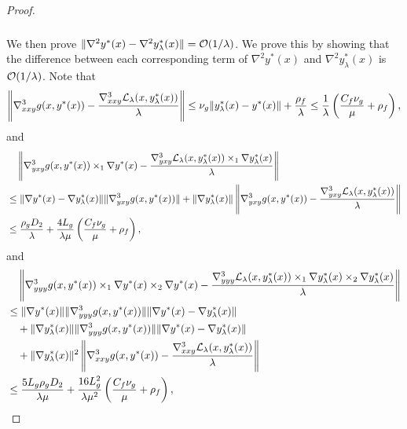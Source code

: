 \begin{proof}
{\begin{align}
\begin{split}
    \end{split}
    \end{align}}
{We then prove $\Vert \nabla^2 y^*(x) - \nabla^2 y_{\lambda}^*(x) \Vert = {\mathcal{O}}(1/\lambda)$. We prove this by showing that the difference between each corresponding term of $\nabla^2 y^*(x)$ and $\nabla^2 y_{\lambda}^*(x)$ is ${\mathcal{O}}(1/\lambda)$.}
Note that 
\begin{align*}
    \left \Vert  \nabla_{xxy}^3  g(x,y^*(x)) - \frac{\nabla_{xxy}^3 {\mathcal{L}}_{\lambda} (x,y_{\lambda}^*(x))  }{\lambda}   \right \Vert \le \nu_g \Vert y_{\lambda}^*(x) - y^*(x) \Vert + \frac{\rho_f}{\lambda} \le \frac{1}{\lambda} \left(\frac{C_f \nu_g}{\mu} +\rho_f \right),
\end{align*}
and
\begin{align*}
    &\quad \left \Vert 
    \nabla_{yxy}^3 g(x,y^*(x)) \times_1 \nabla y^*(x)  - \frac{\nabla_{yxy}^3 {\mathcal{L}}_{\lambda} (x,y_{\lambda}^*(x)) \times_1 \nabla y_{\lambda}^*(x) }{\lambda}
    \right \Vert \\
    &\le \Vert \nabla y^*(x) - \nabla y_{\lambda}^*(x) \Vert \Vert \nabla_{yxy}^3 g(x,y^*(x)) \Vert + \Vert \nabla y_{\lambda}^*(x) \Vert \left\Vert \nabla_{yxy}^3 g(x,y^*(x)) - \frac{\nabla_{yxy}^3 {\mathcal{L}}_{\lambda}(x, y_{\lambda}^*(x))}{\lambda} \right \Vert \\
    &\le \frac{\rho_g D_2}{\lambda} + \frac{4L_g}{\lambda \mu} \left( \frac{C_f \nu_g}{\mu} + \rho_f \right),
\end{align*}
and
{ 
\begin{align*}
    &\quad  \left \Vert
   \nabla_{yyy}^3 g(x,y^*(x)) \times_1  \nabla y^*(x)  \times_2 \nabla y^*(x)  - \frac{\nabla_{yyy}^3 {\mathcal{L}}_{\lambda} (x,y_{\lambda}^*(x)) \times_1 \nabla y_{\lambda}^*(x) \times_2  \nabla y_{\lambda}^*(x)} { \lambda}
    \right \Vert \\
    &\le \Vert \nabla y^*(x) \Vert \Vert \nabla_{yyy}^3 g(x,y^*(x))\Vert \Vert \nabla y^*(x) - \nabla y_{\lambda}^*(x) \Vert  \\
    &\quad + \Vert \nabla y_{\lambda}^*(x) \Vert \Vert \nabla_{yyy}^3 g(x,y^*(x))\Vert \Vert \nabla y^*(x) - \nabla y_{\lambda}^*(x) \Vert  \\
    &\quad +  \Vert \nabla y_{\lambda}^*(x) \Vert^2  \left \Vert  \nabla_{xxy}^3  g(x,y^*(x)) - \frac{\nabla_{xxy}^3 {\mathcal{L}}_{\lambda} (x,y_{\lambda}^*(x))  }{\lambda}   \right \Vert \\
    &\le  \frac{5L_g \rho_g D_2}{\lambda \mu} + \frac{16L_g^2 }{\lambda \mu^2} \left( \frac{C_f \nu_g}{\mu} + \rho_f \right),
\end{align*}}

\end{proof}
